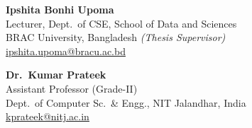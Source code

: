 \documentclass[a4paper,10pt]{article}
\begin{document}
\begin{minipage}[t]{0.48\textwidth}
\textbf{Ipshita Bonhi Upoma} \\
Lecturer, Dept.\ of CSE, School of Data and Sciences \\
BRAC University, Bangladesh \textit{(Thesis Supervisor)} \\
\href{mailto:ipshita.upoma@bracu.ac.bd}{ipshita.upoma@bracu.ac.bd}
\end{minipage}
\hfill
\begin{minipage}[t]{0.48\textwidth}
\textbf{Dr.\ Kumar Prateek} \\
Assistant Professor (Grade-II) \\
Dept.\ of Computer Sc.\ \& Engg., NIT Jalandhar, India \\
\href{mailto:kprateek@nitj.ac.in}{kprateek@nitj.ac.in}
\end{minipage}
\end{document}
